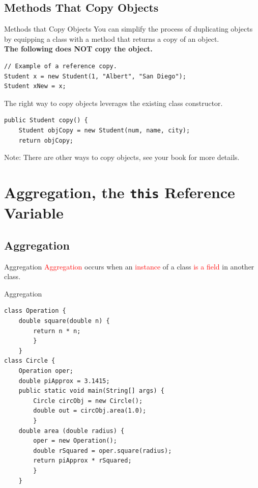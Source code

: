 \documentclass[11pt]{beamer}
\newcommand{\red}[1]{\textcolor{red}{#1}}
\begin{document}
\subsection{Methods That Copy Objects}
\begin{frame}[fragile]{Methods that Copy Objects}
    You can simplify the process of duplicating objects by equipping a class with a method that returns a copy of an object. \\ \vspace{1em}
    \textbf{The following does NOT copy the object.}
    \begin{lstlisting}
// Example of a reference copy.
Student x = new Student(1, "Albert", "San Diego");
Student xNew = x; 
    \end{lstlisting}
    The right way to copy objects leverages the existing class constructor.
    \begin{lstlisting}
public Student copy() {
    Student objCopy = new Student(num, name, city);
    return objCopy;
    \end{lstlisting}
Note: There are other ways to copy objects, see your book for more details.
\end{frame}

\section{Aggregation, the \texttt{this} Reference Variable}
\subsection{Aggregation}
\begin{frame}[fragile]{Aggregation}
    \red{Aggregation} occurs when an \red{instance} of a class \red{is a field} in another class. \\ \vspace{1em}
\end{frame}
\begin{frame}[fragile]{Aggregation}
\begin{lstlisting}[basicstyle=\ttfamily\footnotesize]
class Operation {
    double square(double n) {
        return n * n;
        }
    }
class Circle {
    Operation oper;
    double piApprox = 3.1415;
    public static void main(String[] args) {
        Circle circObj = new Circle();
        double out = circObj.area(1.0);
        }
    double area (double radius) {
        oper = new Operation();
        double rSquared = oper.square(radius);
        return piApprox * rSquared;
        }
    }
    \end{lstlisting}
\end{frame}
\end{document}
